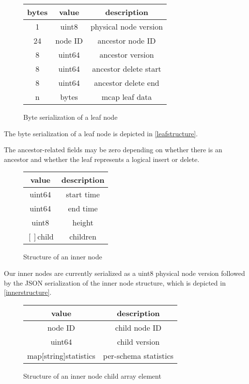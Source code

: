 \documentclass[9pt,twocolumn]{article}
\begin{document}
    \begin{figure}
      \begin{tabular}{ |c|c|c| }
        \hline
        bytes & value & description \\
        \hline
        1 & uint8 & physical node version \\
        24 & node ID & ancestor node ID \\
        8 & uint64 & ancestor version \\
        8 & uint64 & ancestor delete start \\
        8 & uint64 & ancestor delete end \\
        n & bytes & mcap leaf data \\
        \hline
      \end{tabular}
      \caption{Byte serialization of a leaf node}
      \label{leafstructure}
    \end{figure}

    The byte serialization of a leaf node is depicted in \autoref{leafstructure}.

    The ancestor-related fields may be zero depending on whether there is an
    ancestor and whether the leaf represents a logical insert or delete.

    \begin{figure}
      \begin{tabular}{ |c|c| }
        \hline
        value & description \\
        \hline
        uint64 & start time \\
        uint64 & end time \\
        uint8 & height \\
        $[]$child & children \\
        \hline
      \end{tabular}
      \caption{Structure of an inner node}
      \label{innerstructure}
    \end{figure}

    Our inner nodes are currently serialized as a uint8 physical node version
    followed by the JSON serialization of the inner node structure, which is
    depicted in \autoref{innerstructure}.

    \begin{figure}
      \begin{tabular}{ |c|c| }
        \hline
        value & description \\
        \hline
        node ID & child node ID \\
        uint64 & child version \\
        map[string]statistics & per-schema statistics \\
        \hline
      \end{tabular}
      \caption{Structure of an inner node child array element}
      \label{childstructure}
    \end{figure}
\end{document}
